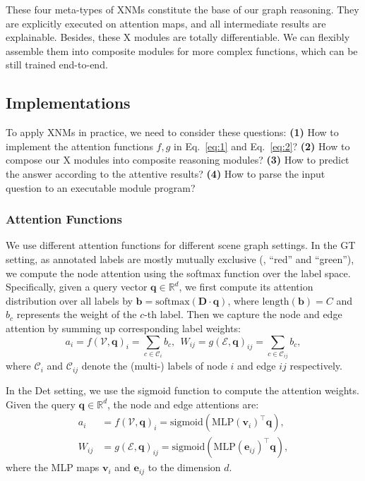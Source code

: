 \documentclass[10pt,twocolumn,letterpaper]{article}
\begin{document}
These four meta-types of XNMs constitute the base of our graph reasoning.
They are explicitly executed on attention maps, and all intermediate results are explainable.
Besides, these X modules are totally differentiable.
We can flexibly assemble them into composite modules for more complex functions, which can be still trained end-to-end.










\subsection{Implementations}
To apply XNMs in practice, we need to consider these questions:
\textbf{(1)} How to implement the attention functions $f,g$ in Eq.~\eqref{eq:1} and Eq.~\eqref{eq:2}?
\textbf{(2)} How to compose our X modules into composite reasoning modules? \textbf{(3)} How to predict the answer according to the attentive results?
\textbf{(4)} How to parse the input question to an executable module program?

\vspace{-0.2cm}
\subsubsection{Attention Functions}
We use different attention functions for different scene graph settings.
In the GT setting, as annotated labels are mostly mutually exclusive (\eg, ``red'' and ``green''), we compute the node attention using the softmax function over the label space.
Specifically, given a query vector $\mathbf{q} \in \mathbb{R}^d$, we first compute its attention distribution over all labels by $\mathbf{b} = \mathrm{softmax}(\mathbf{D} \cdot \mathbf{q})$, where $\mathrm{length}(\mathbf{b})=C$ and $b_c$ represents the weight of the $c$-th label.
Then we capture the node and edge attention by summing up corresponding label weights:
\begin{equation}\label{eq:softmax-att}
    a_i = f(\mathcal{V}, \mathbf{q})_i = \sum_{c \in \mathcal{C}_i} b_c,~~
    W_{ij} = g(\mathcal{E}, \mathbf{q})_{ij} = \sum_{c \in \mathcal{C}_{ij}} b_c,
\end{equation}
where $\mathcal{C}_i$ and $\mathcal{C}_{ij}$ denote the (multi-) labels of node $i$ and edge $ij$ respectively.


In the Det setting, we use the sigmoid function to compute the attention weights.
Given the query $\mathbf{q} \in \mathbb{R}^d$, the node and edge attentions are:
\begin{equation}\label{eq:sigmoid-att}
\begin{aligned}
    a_i &= f(\mathcal{V}, \mathbf{q})_i = \mathrm{sigmoid}\left(\textrm{MLP}(\mathbf{v}_i)^\top \mathbf{q}\right),\\
    W_{ij} &= g(\mathcal{E}, \mathbf{q})_{ij} = \mathrm{sigmoid}\left(\textrm{MLP}(\mathbf{e}_{ij})^\top \mathbf{q}\right),
\end{aligned}
\end{equation}
where the MLP maps $\mathbf{v}_i$ and $\mathbf{e}_{ij}$ to the dimension $d$.
\end{document}
